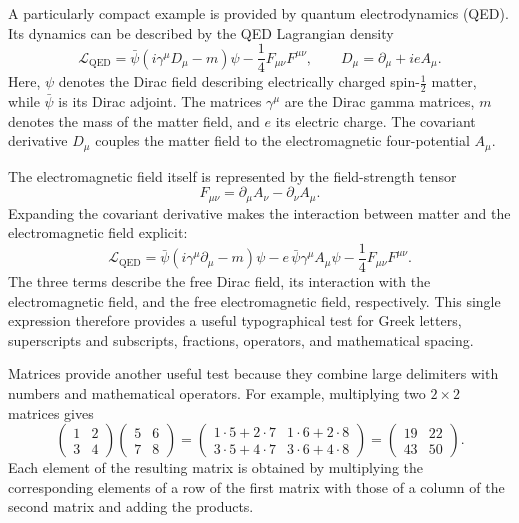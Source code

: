 \documentclass[
11pt,
a4paper,
oneside
]{scrbook}
\begin{document}
A particularly compact example is provided by quantum electrodynamics
(QED). Its dynamics can be described by the QED Lagrangian density
\begin{equation}
	\mathcal{L}_{\mathrm{QED}}
	=
	\bar{\psi}
	\left(
	i\gamma^\mu D_\mu - m
	\right)
	\psi
	-
	\frac{1}{4}
	F_{\mu\nu}F^{\mu\nu},
	\qquad
	D_\mu = \partial_\mu + i e A_\mu .
	\tag{4.15}
\end{equation}
Here, $\psi$ denotes the Dirac field describing electrically charged
spin-$\frac{1}{2}$ matter, while $\bar{\psi}$ is its Dirac adjoint.
The matrices $\gamma^\mu$ are the Dirac gamma matrices, $m$ denotes the
mass of the matter field, and $e$ its electric charge. The covariant
derivative $D_\mu$ couples the matter field to the electromagnetic
four-potential $A_\mu$.

The electromagnetic field itself is represented by the field-strength
tensor
\begin{equation}
	F_{\mu\nu}
	=
	\partial_\mu A_\nu
	-
	\partial_\nu A_\mu .
	\tag{4.16}
\end{equation}
Expanding the covariant derivative makes the interaction between matter
and the electromagnetic field explicit:
\begin{equation}
	\mathcal{L}_{\mathrm{QED}}
	=
	\bar{\psi}
	\left(
	i\gamma^\mu \partial_\mu - m
	\right)
	\psi
	-
	e\,\bar{\psi}\gamma^\mu A_\mu\psi
	-
	\frac{1}{4}
	F_{\mu\nu}F^{\mu\nu}.
	\tag{4.17}
\end{equation}
The three terms describe the free Dirac field, its interaction with the
electromagnetic field, and the free electromagnetic field, respectively.
This single expression therefore provides a useful typographical test for
Greek letters, superscripts and subscripts, fractions, operators, and
mathematical spacing.

Matrices provide another useful test because they combine large delimiters
with numbers and mathematical operators. For example, multiplying two
$2\times2$ matrices gives
\begin{equation}
	\begin{pmatrix}
		1 & 2 \\
		3 & 4
	\end{pmatrix}
	\begin{pmatrix}
		5 & 6 \\
		7 & 8
	\end{pmatrix}
	=
	\begin{pmatrix}
		1\cdot5+2\cdot7 & 1\cdot6+2\cdot8 \\
		3\cdot5+4\cdot7 & 3\cdot6+4\cdot8
	\end{pmatrix}
	=
	\begin{pmatrix}
		19 & 22 \\
		43 & 50
	\end{pmatrix}.
	\tag{4.18}
\end{equation}
Each element of the resulting matrix is obtained by multiplying the
corresponding elements of a row of the first matrix with those of a column
of the second matrix and adding the products.
\end{document}
